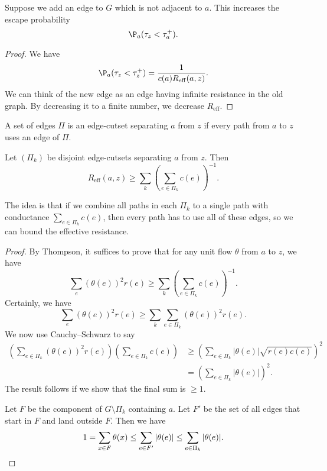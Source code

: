 \documentclass[a4paper]{article}
\let\div\relax
\DeclareMathOperator\div{div}
\begin{document}
\begin{cor}
  Suppose we add an edge to $G$ which is not adjacent to $a$. This increases the escape probability
  \[
    \P_a(\tau_z < \tau_a^+).
  \]
\end{cor}

\begin{proof}
  We have
  \[
    \P_a(\tau_z < \tau_z^+) = \frac{1}{c(a) R_{\mathrm{eff}}(a, z)}.
  \]
  We can think of the new edge as an edge having infinite resistance in the old graph. By decreasing it to a finite number, we decrease $R_{\mathrm{eff}}$.
\end{proof}

\begin{defi}
  A set of edges $\Pi$ is an edge-cutset separating $a$ from $z$ if every path from $a$ to $z$ uses an edge of $\Pi$.
\end{defi}

\begin{thm}
  Let $(\Pi_k)$ be disjoint edge-cutsets separating $a$ from $z$. Then
  \[
    R_{\mathrm{eff}}(a, z) \geq \sum_k \left(\sum_{e \in \Pi_k}c(e)\right)^{-1}.
  \]
\end{thm}
The idea is that if we combine all paths in each $\Pi_k$ to a single path with conductance $\sum_{e \in \Pi_k} c(e)$, then every path has to use all of these edges, so we can bound the effective resistance.

\begin{proof}
  By Thompson, it suffices to prove that for any unit flow $\theta$ from $a$ to $z$, we have
  \[
    \sum_e (\theta(e))^2 r(e) \geq \sum_k \left(\sum_{e \in \Pi_k}c(e)\right)^{-1}.
  \]
  Certainly, we have
  \[
    \sum_e (\theta(e))^2 r(e) \geq \sum_k \sum_{e \in \Pi_k}(\theta(e))^2 r(e).
  \]
  We now use Cauchy--Schwarz to say
  \begin{align*}
    \left(\sum_{e \in \Pi_k} (\theta(e))^2 r(e)\right) \left(\sum_{e \in \Pi_k}c(e)\right) &\geq \left(\sum_{e \in \Pi_k} |\theta(e)| \sqrt{r(e) c(e)} \right)^2\\
    &= \left(\sum_{e \in \Pi_k} |\theta(e)|\right)^2.
  \end{align*}
  The result follows if we show that the final sum is $\geq 1$.

  Let $F$ be the component of $G \setminus \Pi_k$ containing $a$. Let $F'$ be the set of all edges that start in $F$ and land outside $F$. Then we have
  \[
    1 = \sum_{x \in F} \div \theta(x) \leq \sum_{e \in F'} |\theta(e)| \leq \sum_{e \in \Pi_k} |\theta(e)|.\qedhere
  \]
\end{proof}
\end{document}
